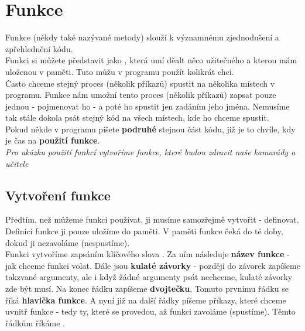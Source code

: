 \section{Funkce}
Funkce (někdy také nazývané metody) slouží k významnému zjednodušení a zpřehlednění kódu.\\
Funkci si můžete představit jako , která umí děalt něco užitečného a kterou mám uloženou v paměti. Tuto  můžu v programu použít kolikrát chci.\\
Často chceme stejný proces (několik příkazů) spustit na několika místech v programu. Funkce nám umožní tento proces (několik příkazů) zapsat pouze jednou - pojmenovat ho - a poté ho spustit jen zadáním jeho jména. Nemusíme tak stále dokola psát stejný kód na všech místech, kde ho chceme spustit.\\
Pokud někde v programu píšete \textbf{podruhé} stejnou část kódu, již je to chvíle, kdy je čas na \textbf{použití funkce}.\\

\vspace{1cm}
\textit{Pro ukázku použití funkcí vytvoříme funkce, které budou zdravit naše kamarády a učitele}

\subsection{Vytvoření funkce}
Předtím, než můžeme funkci používat, ji musíme samozřejmě vytvořit - definovat. Definicí funkce ji pouze uložíme do paměti. V paměti funkce čeká do té doby, dokud ji nezavoláme (nespustíme).\\ 
Funkci vytvoříme zapsáním klíčového slova . Za ním následuje \textbf{název funkce} - jak chceme funkci volat. Dále jsou \textbf{kulaté závorky} - později do závorek zapíšeme takzvané argumenty, ale i když žádné argumenty psát nechceme, kulaté závorky zde být musí. Na konec řádku zapíšeme \textbf{dvojtečku}. Tomuto prvnímu řádku se říká \textbf{hlavička funkce}. A nyní již na další řádky píšeme příkazy, které chceme uvnitř funkce - tedy ty, které se provedou, až funkci zavoláme (spustíme). Těmto řádkům říkáme .\\


